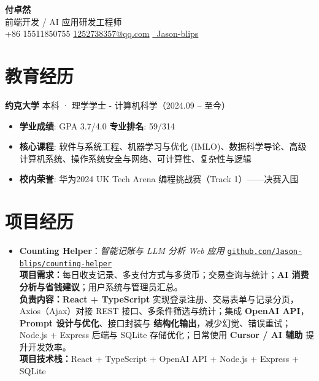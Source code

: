 \documentclass[a4paper]{article}
\begin{document}
\begin{center}
    \Huge \textbf{付卓然} \\[0.3cm]
    \normalsize 前端开发 / AI 应用研发工程师 \\
    \small +86 15511850755 \quad \href{mailto:1252738357@qq.com}{1252738357@qq.com} \quad \href{https://github.com/Jason-blips}{\color{githubblue}\faGithub\ Jason-blips}
\end{center}
\vspace{-0.3cm}

\section{教育经历}
\textbf{约克大学} \hfill 本科 · 理学学士 - 计算机科学（2024.09 -- 至今）
\begin{itemize}
    \item \textbf{学业成绩}: GPA 3.7/4.0 \hfill \textbf{专业排名}: 59/314
    \item \textbf{核心课程}: 软件与系统工程、机器学习与优化 (IMLO)、数据科学导论、高级计算机系统、操作系统安全与网络、可计算性、复杂性与逻辑
    \item \textbf{校内荣誉}: 华为2024 UK Tech Arena 编程挑战赛（Track 1）——决赛入围
\end{itemize}
\vspace{0.2cm}

\section{项目经历}

\begin{itemize}[leftmargin=0pt, itemsep=8pt, label={}]
\item
  \textbf{Counting Helper}：\textit{智能记账与 LLM 分析 Web 应用}
  \hfill \href{https://github.com/Jason-blips/counting-helper}{\texttt{github.com/Jason-blips/counting-helper}}\\[2pt]
  \textbf{项目需求：}每日收支记录、多支付方式与多货币；交易查询与统计；\textbf{AI 消费分析与省钱建议}；用户系统与管理员汇总。\\
  \textbf{负责内容：}\textbf{React + TypeScript} 实现登录注册、交易表单与记录分页，Axios（Ajax）对接 REST 接口、多条件筛选与统计；集成 \textbf{OpenAI API}，\textbf{Prompt 设计与优化}、接口封装与 \textbf{结构化输出}，减少幻觉、错误重试；Node.js + Express 后端与 SQLite 存储优化；日常使用 \textbf{Cursor / AI 辅助} 提升开发效率。\\
  \textbf{项目技术栈：}React \;+\; TypeScript \;+\; OpenAI API \;+\; Node.js \;+\; Express \;+\; SQLite
\end{itemize}
\vspace{0.2cm}
\end{document}
